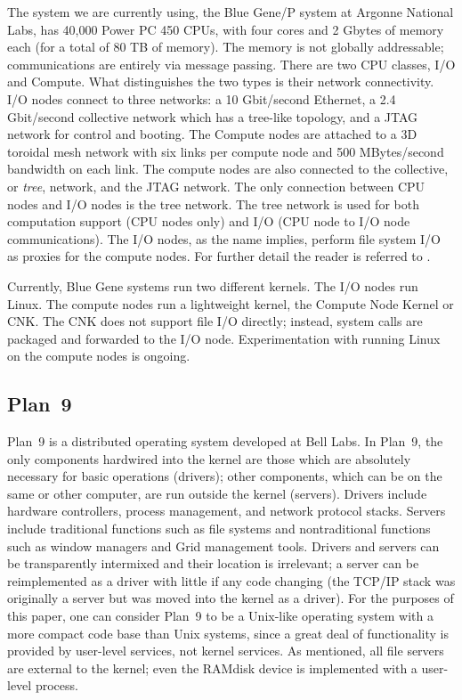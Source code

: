 \documentclass[letterpaper,twocolumn,10pt]{article}
\begin{document}
The system we are currently using, the Blue Gene/P system at Argonne National Labs, has 40,000 Power PC 450 CPUs, 
with four cores and 2 Gbytes of memory each (for a total of 80 TB of memory). The memory is not globally addressable; communications are entirely via message passing. 
There are two CPU classes, I/O and Compute. What distinguishes the two types is their network connectivity. I/O nodes connect
to three networks: a 10 Gbit/second Ethernet, a 2.4 Gbit/second collective network which has a tree-like topology, and
a JTAG network for control and booting. The Compute nodes are attached to a 3D toroidal mesh network with six links per compute node and 500 MBytes/second bandwidth on each link.  The compute nodes are also connected to the collective, or {\em tree}, network, and the JTAG network. The only connection between CPU nodes and I/O nodes is the tree network. The tree network is used for both computation support (CPU nodes only) and I/O (CPU node to I/O node communications). The I/O nodes, as the name implies, perform file system I/O as proxies for the 
compute nodes. For further detail the reader is referred to \cite{plan9bgp}. 

Currently, Blue Gene systems run two different kernels. The I/O nodes run Linux. The compute nodes run a lightweight kernel, the Compute Node Kernel or CNK. The CNK does not support file I/O directly; instead, system calls are packaged and forwarded to the I/O node. Experimentation with running Linux on the compute nodes is ongoing. 

\subsection{Plan~9}
Plan~9\cite{Plan9} is a distributed operating system developed at Bell Labs. In Plan~9, the only components hardwired into the kernel are those which are absolutely necessary for basic operations (drivers); other components, which can be on the same or other computer, are run outside the kernel (servers). Drivers include hardware controllers, process management, and network protocol stacks. Servers include traditional functions such as file systems and nontraditional functions such as window managers and Grid management tools. Drivers and servers can be transparently intermixed and their location is irrelevant; a server can be reimplemented as a driver with little if any code changing (the TCP/IP stack was originally a server but was moved into the kernel as a driver). For the purposes of this paper, one can consider Plan~9 to be a Unix-like operating 
system with a more compact code base than Unix systems, since a great deal of functionality is provided by user-level services, not kernel services. As mentioned, all file servers are external to the kernel; even the 
RAMdisk 
device is implemented with a user-level process. 
\end{document}

